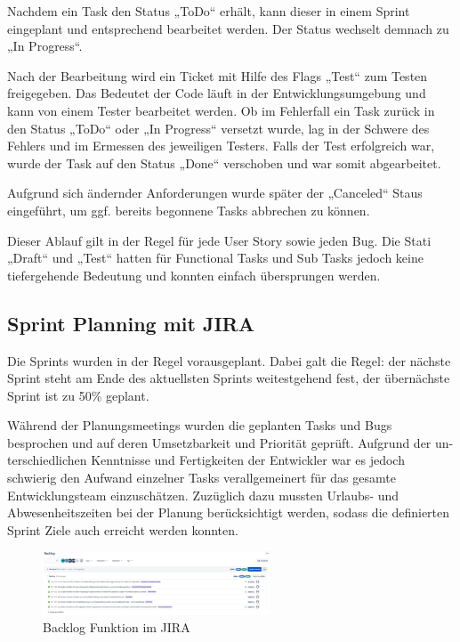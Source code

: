 Nachdem ein Task den Status „ToDo“ erhält, kann dieser in einem Sprint eingeplant und entsprechend bearbeitet werden. Der Status wechselt demnach zu „In Progress“. 

Nach der Bearbeitung wird ein Ticket mit Hilfe des Flags „Test“ zum Testen freigegeben. Das Bedeutet der Code läuft in der Entwicklungsumgebung und kann von einem Tester bearbeitet werden. Ob im Fehlerfall ein Task zurück in den Status „ToDo“ oder „In Progress“ versetzt wurde, lag in der Schwere des Fehlers und im Ermessen des jeweiligen Testers. Falls der Test erfolgreich war, wurde der Task auf den Status „Done“ verschoben und war somit abgearbeitet.

Aufgrund sich ändernder Anforderungen wurde später der „Canceled“ Staus eingeführt, um ggf. bereits begonnene Tasks abbrechen zu können.

Dieser Ablauf gilt in der Regel für jede User Story sowie jeden Bug. Die Stati „Draft“ und „Test“ hatten für Functional Tasks und Sub Tasks jedoch keine tiefergehende Bedeutung und konnten einfach übersprungen werden.

\subsection{Sprint Planning mit JIRA}
Die Sprints wurden in der Regel vorausgeplant. Dabei galt die Regel: der nächste Sprint steht am Ende des aktuellsten Sprints weitestgehend fest, der übernächste Sprint ist zu 50\% geplant. 

Während der Planungsmeetings wurden die geplanten Tasks und Bugs besprochen und auf deren Umsetzbarkeit und Priorität geprüft. Aufgrund der un-terschiedlichen Kenntnisse und Fertigkeiten der Entwickler war es jedoch schwierig den Aufwand einzelner Tasks verallgemeinert für das gesamte Entwicklungsteam einzuschätzen. Zuzüglich dazu mussten Urlaubs- und Abwesenheitszeiten bei der Planung berücksichtigt werden, sodass die definierten Sprint Ziele auch erreicht werden konnten.

\begin{figure}[h!]
    \centering
    \includegraphics[width=0.6\textwidth]{figures/andre/jirabacklog.jpg}
    \caption{Backlog Funktion im JIRA}
    \label{fig:jirabacklog}
\end{figure}

